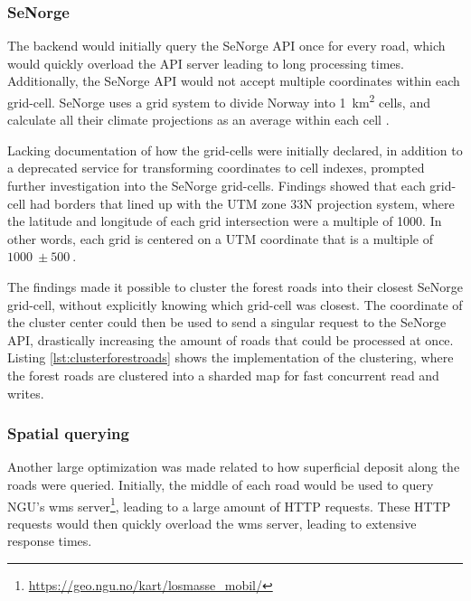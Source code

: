 \subsubsection{SeNorge} \label{subsubsec:implementation:optimization:senorge}

The backend would initially query the SeNorge API once for every road, which would quickly overload the API server leading to long processing times. Additionally, the SeNorge API would not accept multiple coordinates within each grid-cell. SeNorge uses a grid system to divide Norway into \qty{1}{\kilo\meter\squared} cells, and calculate all their climate projections as an average within each cell \cite{senorge_watermap}. 

Lacking documentation of how the grid-cells were initially declared, in addition to a deprecated service for transforming coordinates to cell indexes, prompted further investigation into the SeNorge grid-cells. Findings showed that each grid-cell had borders that lined up with the UTM zone 33N projection system, where the latitude and longitude of each grid intersection were a multiple of \qty{1000}{}. In other words, each grid is centered on a UTM coordinate that is a multiple of $\qty{1000}{}\pm\qty{500}{}$.

The findings made it possible to cluster the forest roads into their closest SeNorge grid-cell, without explicitly knowing which grid-cell was closest. The coordinate of the cluster center could then be used to send a singular request to the SeNorge API, drastically increasing the amount of roads that could be processed at once. Listing \ref{lst:clusterforestroads} shows the implementation of the clustering, where the forest roads are clustered into a sharded map for fast concurrent read and writes.

\begin{figure}[h]

\end{figure}

\subsubsection{Spatial querying}

Another large optimization was made related to how superficial deposit along the roads were queried. Initially, the middle of each road would be used to query NGU's \Gls{wms} server\footnote{\url{https://geo.ngu.no/kart/losmasse_mobil/}}, leading to a large amount of HTTP requests. These HTTP requests would then quickly overload the \Gls{wms} server, leading to extensive response times.

